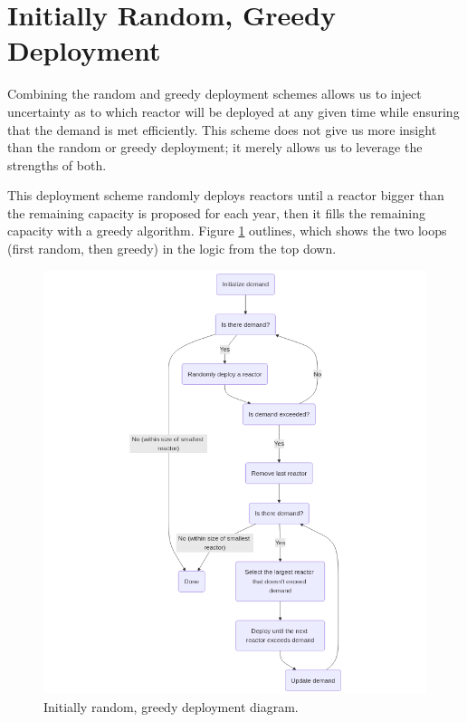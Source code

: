 \section{Initially Random, Greedy Deployment}
\label{sec:initially_random_greedy}

Combining the random and greedy deployment schemes allows us to inject uncertainty as to which reactor will be deployed at any given time while ensuring that the demand is met efficiently. This scheme does not give us more insight than the random or greedy deployment; it merely allows us to leverage the strengths of both.

This deployment scheme randomly deploys reactors until a reactor bigger than the remaining capacity is proposed for each year, then it fills the remaining capacity with a greedy algorithm. Figure \ref{fig:init_random_greedy_diagram} outlines, which shows the two loops (first random, then greedy) in the logic from the top down.

\begin{figure}[H]
    \centering
    \includegraphics[scale=0.3]{images/schemes/random_greedy_diagram.png}
    \caption{Initially random, greedy deployment diagram.}
    \label{fig:init_random_greedy_diagram}
\end{figure}


